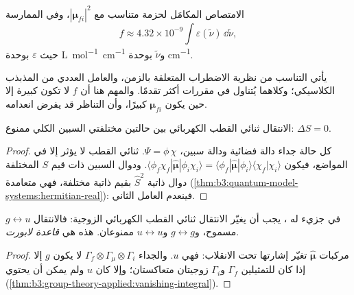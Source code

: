 \begin{proposition}\label{prop:b3:electronic-spectroscopy:intensity}
الامتصاص المكامَل لحزمة متناسب مع $|\boldsymbol\mu_{fi}|^2$،
وفي الممارسة
\[
f \approx 4.32\times10^{-9}\int\varepsilon(\tilde\nu)\,\dd\tilde\nu,
\]
حيث $\varepsilon$ بوحدة \unit{L.mol^{-1}.cm^{-1}} و$\tilde\nu$ بوحدة \unit{cm^{-1}}.
\end{proposition}
\admitted

يأتي التناسب من نظرية الاضطراب المتعلقة بالزمن، 
والعامل العددي من المذبذب الكلاسيكي؛ وكلاهما يُتناول في مقررات
أكثر تقدمًا. والمهم هنا أن $f$ لا تكون كبيرة إلا حين يكون
$\boldsymbol\mu_{fi}$ كبيرًا، وأن التناظر قد يفرض انعدامه.

\begin{theorem}\label{thm:b3:electronic-spectroscopy:spin-rule}
الانتقال ثنائي القطب الكهربائي بين حالتين مختلفتي السبين الكلي
ممنوع: $\Delta S = 0$.
\end{theorem}

\begin{proof}
كل حالة جداء دالة فضائية ودالة سبين، $\Psi = \phi\,\chi$.
 ثنائي القطب لا يؤثر إلا في المواضع، فيكون $\langle\phi_f\chi_f|\hat{\boldsymbol\mu}|
\phi_i\chi_i\rangle = \langle\phi_f|\hat{\boldsymbol\mu}|\phi_i\rangle\langle\chi_f|\chi_i\rangle$.
ودوال السبين ذات قيم $S$ المختلفة دوال ذاتية  $\hat S^2$ بقيم ذاتية
مختلفة، فهي متعامدة (\cref{thm:b3:quantum-model-systems:hermitian-real}):
فينعدم العامل الثاني.
\end{proof}

\begin{theorem}\label{thm:b3:electronic-spectroscopy:laporte}
في جزيء له ، يجب أن يغيّر الانتقال ثنائي القطب الكهربائي
الزوجية: فالانتقال $g \leftrightarrow u$ مسموح، و$g \leftrightarrow g$ و$u
\leftrightarrow u$ ممنوعان. هذه هي \emph{قاعدة لابورت}.
\end{theorem}

\begin{proof}
مركبات $\hat{\boldsymbol\mu}$ تغيّر إشارتها تحت الانقلاب: فهي $u$.
والجداء $\Gamma_f\otimes\Gamma_\mu\otimes\Gamma_i$ لا يكون $g$ إلا إذا كان للتمثيلين $\Gamma_f$ و$\Gamma_i$
زوجيتان متعاكستان؛ وإلا كان $u$ ولم يمكن أن يحتوي  (\cref{thm:b3:group-theory-applied:vanishing-integral}).
\end{proof}

